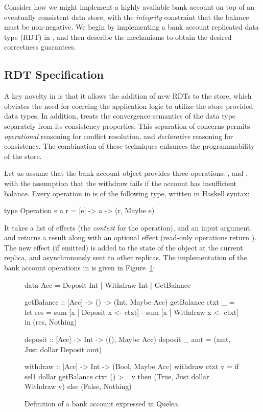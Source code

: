 Consider how we might implement a highly available bank account on top of an
eventually consistent data store, with the \emph{integrity} constraint that the
balance must be non-negative. We begin by implementing a bank account
replicated data type (RDT) in \quelea, and then describe the mechanisms to
obtain the desired correctness guarantees.

\subsection{RDT Specification}

A key novelty in \quelea is that it allows the addition of new RDTs to the
store, which obviates the need for coercing the application logic to utilize
the store provided data types. In addition, \quelea treats the convergence
semantics of the data type separately from its consistency properties. This
separation of concerns permits \emph{operational} reasoning for conflict
resolution, and \emph{declarative} reasoning for consistency. The combination
of these techniques enhances the programmability of the store.

Let us assume that the bank account object provides three operations:
,  and , with the assumption that the
withdraw fails if the account has insufficient balance. Every operation in
\quelea is of the following type, written in Haskell syntax:

\begin{codehaskell}
type Operation e a r = [e] -> a -> (r, Maybe e)
\end{codehaskell}

\noindent It takes a list of effects (the \emph{context} for the operation),
and an input argument, and returns a result along with an optional effect
(read-only operations return ). The new effect (if emitted) is
added to the state of the object at the current replica, and asynchronously
sent to other replicas. The implementation of the bank account operations in
\quelea is given in Figure~\ref{fig:ex}:

\begin{figure}
\begin{codehaskell}
data Acc = Deposit Int | Withdraw Int | GetBalance

getBalance :: [Acc] -> () -> (Int, Maybe Acc)
getBalance ctxt _ =
  let res = sum [x | Deposit x <- ctxt]
						- sum [x | Withdraw x <- ctxt]
	in (res, Nothing)

deposit :: [Acc] -> Int -> ((), Maybe Acc)
deposit _ amt = (amt, Just dollar Deposit amt)

withdraw :: [Acc] -> Int -> (Bool, Maybe Acc)
withdraw ctxt v =
	if sel1 dollar getBalance ctxt () >= v
  then (True, Just dollar Withdraw v)
	else (False, Nothing)
\end{codehaskell}
\caption{Definition of a bank account expressed in Quelea.}
\label{fig:ex}
\end{figure}

